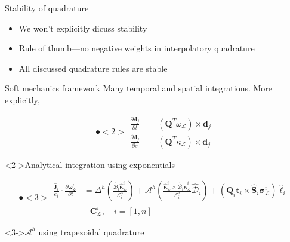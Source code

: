 \documentclass[presentation]{beamer}
\newcommand{\bv}[1]{\ensuremath{\mathbf{#1}}}
\begin{document}
\begin{frame}[label={sec:orgdd3dddf}]{Stability of quadrature}
\begin{itemize}
\item We won't explicitly dicuss stability
\item \alert{Rule of thumb}---no negative weights in interpolatory quadrature
\item All discussed quadrature rules are stable
\end{itemize}
\end{frame}
\begin{frame}[label={sec:org3f920b5}]{Soft mechanics framework}
Many temporal and spatial integrations. More explicitly,

\[ \spot<2>{\begin{aligned}
   \frac{\partial \bv{d}_j}{\partial t} &= \left( \bv{Q}^T
   \omega_{\mathcal{L}}\right) \times \bv{d}_j \\
   \frac{\partial \bv{d}_j}{\partial s} &= \left( \bv{Q}^T
   \kappa_{\mathcal{L}}\right) \times \bv{d}_j
   \end{aligned}} \]
\begin{block}<2->{Analytical integration using exponentials}
\end{block}
\[ \spot<3>{\begin{aligned}\frac{\hat{\mathbf{J}}_i}{e_i} \cdot \frac{\partial
	\boldsymbol{\omega}^i_{\mathcal{L}}}{\partial t} &=
	\Delta^h\left(\frac{\hat{\boldsymbol{\mathcal{B}}}_i\hat{\boldsymbol{\kappa}}_{\mathcal{L}}^{i}}{\mathcal{E}_i^3}\right) +
	\mathcal{A}^h\left(\frac{\hat{\boldsymbol{\kappa}}_{\mathcal{L}}^i\times\hat{\boldsymbol{\mathcal{B}}}_i
	\hat{\boldsymbol{\kappa}}_{\mathcal{L}}^i}{\mathcal{E}_i^3}
	\hat{\mathcal{D}}_i\right) + \left(\mathbf{Q}_i\mathbf{t}_i\times\hat{\mathbf{S}}_i\boldsymbol{\sigma}^i_{\mathcal{L}}\right)\hat{\ell}_i\\
	&+ \mathbf{C}^i_{\mathcal{L}},\quad i=[1,n] \end{aligned}}\]
\begin{block}<3->{\(\mathcal{A}^{h}\) using trapezoidal quadrature}
\end{block}
\end{frame}
\end{document}
